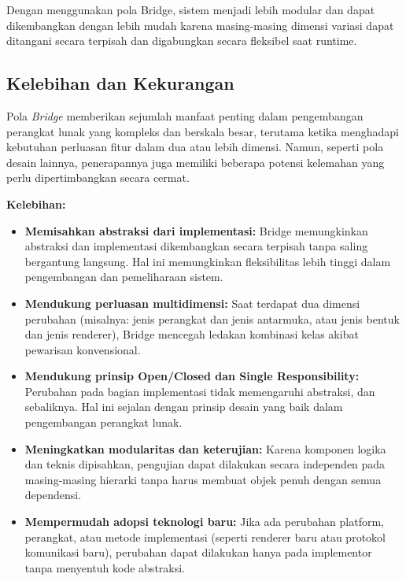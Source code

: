 Dengan menggunakan pola Bridge, sistem menjadi lebih modular dan dapat dikembangkan dengan lebih mudah karena masing-masing dimensi variasi dapat ditangani secara terpisah dan digabungkan secara fleksibel saat runtime.

\subsection{Kelebihan dan Kekurangan}

Pola \textit{Bridge} memberikan sejumlah manfaat penting dalam pengembangan perangkat lunak yang kompleks dan berskala besar, terutama ketika menghadapi kebutuhan perluasan fitur dalam dua atau lebih dimensi. Namun, seperti pola desain lainnya, penerapannya juga memiliki beberapa potensi kelemahan yang perlu dipertimbangkan secara cermat.

\textbf{Kelebihan:}
\begin{itemize}
	\item \textbf{Memisahkan abstraksi dari implementasi:} Bridge memungkinkan abstraksi dan implementasi dikembangkan secara terpisah tanpa saling bergantung langsung. Hal ini memungkinkan fleksibilitas lebih tinggi dalam pengembangan dan pemeliharaan sistem.
	
	\item \textbf{Mendukung perluasan multidimensi:} Saat terdapat dua dimensi perubahan (misalnya: jenis perangkat dan jenis antarmuka, atau jenis bentuk dan jenis renderer), Bridge mencegah ledakan kombinasi kelas akibat pewarisan konvensional.
	
	\item \textbf{Mendukung prinsip Open/Closed dan Single Responsibility:} Perubahan pada bagian implementasi tidak memengaruhi abstraksi, dan sebaliknya. Hal ini sejalan dengan prinsip desain yang baik dalam pengembangan perangkat lunak.
	
	\item \textbf{Meningkatkan modularitas dan keterujian:} Karena komponen logika dan teknis dipisahkan, pengujian dapat dilakukan secara independen pada masing-masing hierarki tanpa harus membuat objek penuh dengan semua dependensi.
	
	\item \textbf{Mempermudah adopsi teknologi baru:} Jika ada perubahan platform, perangkat, atau metode implementasi (seperti renderer baru atau protokol komunikasi baru), perubahan dapat dilakukan hanya pada implementor tanpa menyentuh kode abstraksi.
\end{itemize}

